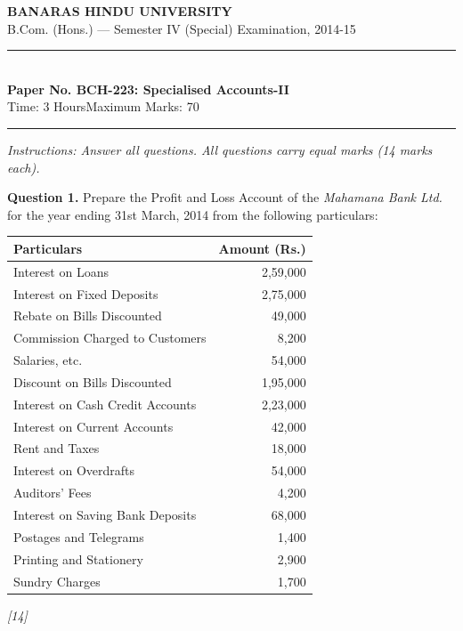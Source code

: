 \documentclass[11pt,a4paper]{article}
\newcommand{\pts}[1]{\hfill   \textit{[#1]}}
\begin{document}
\begin{center}
  {\large\bfseries BANARAS HINDU UNIVERSITY}\\[2pt]
  {\normalsize B.Com. (Hons.) --- Semester IV (Special) Examination, 2014-15}\\[6pt]
  \rule{0.8\linewidth}{0.5pt}\\[6pt]
  {\large\bfseries Paper No. BCH-223: Specialised Accounts-II}\\[4pt]
  {\normalsize Time: 3 Hours\hfill Maximum Marks: 70}
\end{center}

\rule{\linewidth}{0.4pt}

\smallskip



\noindent   \textit{Instructions: Answer all questions. All questions carry equal marks (14 marks each).}

\bigskip




\noindent   \textbf{Question 1.}
Prepare the Profit and Loss Account of the   \textit{Mahamana Bank Ltd.} for the year ending 31st March, 2014 from the following particulars:


\begin{center}
\small

\begin{tabular}{|l|r|}
\hline
   \textbf{Particulars} &   \textbf{Amount (Rs.)} \\
\hline
Interest on Loans & 2,59,000 \\
Interest on Fixed Deposits & 2,75,000 \\
Rebate on Bills Discounted & 49,000 \\
Commission Charged to Customers & 8,200 \\
Salaries, etc. & 54,000 \\
Discount on Bills Discounted & 1,95,000 \\
Interest on Cash Credit Accounts & 2,23,000 \\
Interest on Current Accounts & 42,000 \\
Rent and Taxes & 18,000 \\
Interest on Overdrafts & 54,000 \\
Auditors' Fees & 4,200 \\
Interest on Saving Bank Deposits & 68,000 \\
Postages and Telegrams & 1,400 \\
Printing and Stationery & 2,900 \\
Sundry Charges & 1,700 \\
\hline
\end{tabular}
\end{center}\pts{14}
\end{document}
